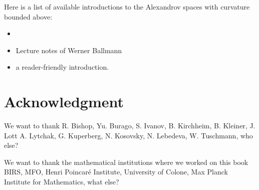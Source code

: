 Here is a list of available introductions to the Alexandrov spaces with curvature bounded above: 
\begin{itemize}
\item \cite{BH}
\item \cite{ballmann:lectures} Lecture notes of Werner Ballmann
\item \cite[Chapter 9]{BBI} a reader-friendly introduction.
\end{itemize}
 


\section*{Acknowledgment}
We want to thank 
R. Bishop, 
Yu. Burago, 
S. Ivanov,
B. Kirchheim, 
B. Kleiner, 
J. Lott
A. Lytchak, 
G. Kuperberg, 
N. Kosovsky, 
N. Lebedeva, 
W. Tuschmann,
who else?


We want to thank the mathematical institutions where we worked on this book
BIRS, 
MFO, 
Henri Poincar\'{e} Institute,
University of Colone, 
Max Planck Institute for Mathematics,
what else?



